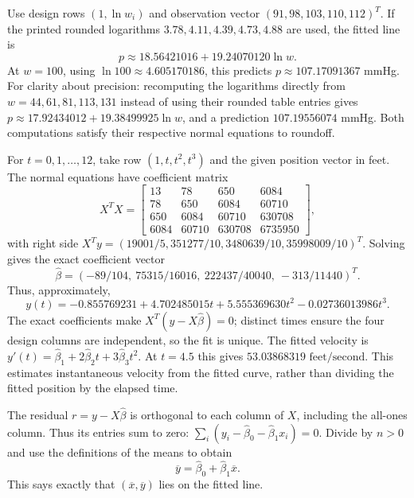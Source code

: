 Use design rows $(1,\ln w_i)$ and observation vector
$(91,98,103,110,112)^T$. If the printed rounded logarithms
$3.78,4.11,4.39,4.73,4.88$ are used, the fitted line is
\[
 p\approx18.56421016+19.24070120\ln w.
\]
At $w=100$, using $\ln100\approx4.605170186$, this predicts
$p\approx107.17091367$ mmHg.
For clarity about precision: recomputing the logarithms directly from
$w=44,61,81,113,131$ instead of using their rounded table entries
gives $p\approx17.92434012+19.38499925\ln w$, and a prediction
$107.19556074$ mmHg. Both computations satisfy their respective
normal equations to roundoff.

For $t=0,1,\ldots,12$, take row $(1,t,t^2,t^3)$ and the given
position vector in feet. The normal equations have coefficient matrix
\[
 X^TX=\begin{bmatrix}
13&78&650&6084\\78&650&6084&60710\\
650&6084&60710&630708\\6084&60710&630708&6735950
\end{bmatrix},
\]
with right side
$X^Ty=(19001/5,351277/10,3480639/10,35998009/10)^T$.
Solving gives the exact coefficient vector
\[
 \widehat\beta=(-89/104,\ 75315/16016,\ 222437/40040,\ -313/11440)^T.
\]
Thus, approximately,
\[
 y(t)=-0.855769231+4.702485015t+5.555369630t^2-0.02736013986t^3.
\]
The exact coefficients make $X^T(y-X\widehat\beta)=0$; distinct
times ensure the four design columns are independent, so the fit is unique.
The fitted velocity is
$y'(t)=\widehat\beta_1+2\widehat\beta_2t+3\widehat\beta_3t^2$.
At $t=4.5$ this gives $\boxed{53.03868319\text{ feet/second}}$.
This estimates instantaneous velocity from the fitted curve, rather
than dividing the fitted position by the elapsed time.

The residual $r=y-X\widehat\beta$ is orthogonal to each column
of $X$, including the all-ones column. Thus its entries sum to zero:
$\sum_i(y_i-\widehat\beta_0-\widehat\beta_1x_i)=0$.
Divide by $n>0$ and use the definitions of the means to obtain
\[
 \overline y=\widehat\beta_0+\widehat\beta_1\overline x.
\]
This says exactly that $(\overline x,\overline y)$ lies on the fitted line.

